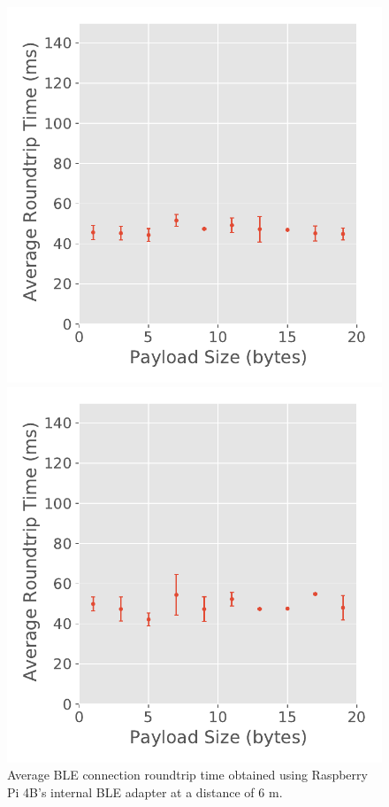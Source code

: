 \begin{figure}[H]
    \centering
    \begin{minipage}{0.45\linewidth}
        \centering
        \includegraphics[width=\linewidth]{images/ble-roundtrip-hci1-600cm.pdf}
        \caption[Average \acs{BLE} connection roundtrip time obtained using the Raspberry Pi 4B's internal \acs{BLE} adapter at a distance of 6 m.]{Average \acs{BLE} connection roundtrip time obtained using Raspberry Pi 4B's internal \acs{BLE} adapter at a distance of $6\text{ m}$.}
        \label{fig:ble-roundtrip-hci1-6m}
    \end{minipage}
    \hspace{0.05\linewidth}
    \begin{minipage}{0.45\linewidth}
        \centering
        \includegraphics[width=\linewidth]{images/ble-roundtrip-hci1-900cm.pdf}

\end{minipage}
\end{figure}
